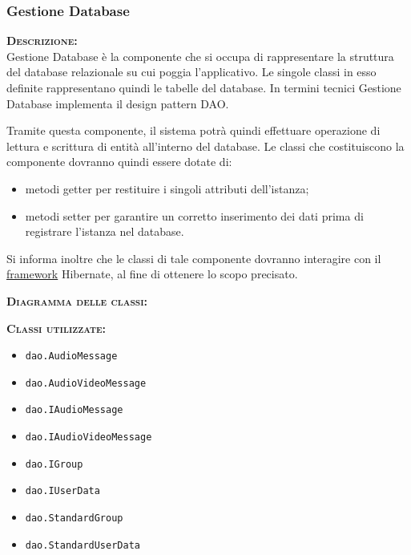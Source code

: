 \subsubsection{Gestione Database}
\begin{description}
\item{\scshape\bfseries Descrizione:}\\
Gestione Database è la componente che si occupa di rappresentare la struttura del database relazionale su cui poggia l'applicativo. Le singole classi in esso definite rappresentano quindi le tabelle del database. In termini tecnici Gestione Database implementa il design pattern DAO\@.

Tramite questa componente, il sistema potrà quindi effettuare operazione di lettura e scrittura di entità all'interno del database. Le classi che costituiscono la componente dovranno quindi essere dotate di:

\begin{itemize}
	\item metodi getter per restituire i singoli attributi dell'istanza;
	\item metodi setter per garantire un corretto inserimento dei dati prima di registrare l'istanza nel database.
\end{itemize}

Si informa inoltre che le classi di tale componente dovranno interagire con il \underline{framework} Hibernate, al fine di ottenere lo scopo precisato.

	\item{\scshape\bfseries Diagramma delle classi:}
	\item{\scshape\bfseries Classi utilizzate:}
\begin{itemize}
  \item \texttt{dao.AudioMessage}
  \item \texttt{dao.AudioVideoMessage}
  \item \texttt{dao.IAudioMessage}
  \item \texttt{dao.IAudioVideoMessage}
  \item \texttt{dao.IGroup}
  \item \texttt{dao.IUserData}
  \item \texttt{dao.StandardGroup}
  \item \texttt{dao.StandardUserData}
\end{itemize}
\end{description}

